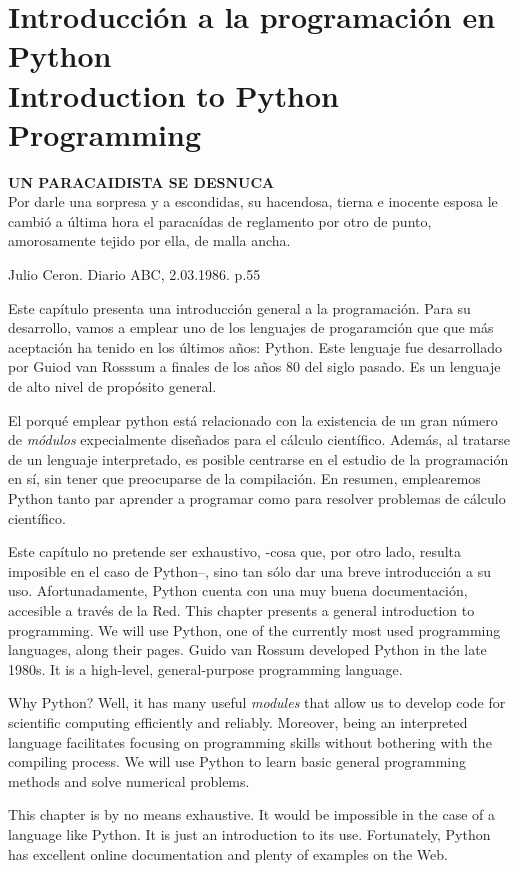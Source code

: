 \chapter{Introducción a la programación en Python\\ Introduction to Python Programming}\label{ch:intpr}  
\epigraph{\textbf{UN PARACAIDISTA SE DESNUCA}\\ Por darle una sorpresa y a escondidas, su hacendosa, tierna e inocente esposa le cambió a última hora el paracaídas de reglamento por otro de punto, amorosamente tejido por ella, de malla ancha.}{Julio Ceron. Diario ABC, 2.03.1986. p.55}
\begin{paracol}{2}
Este capítulo presenta una introducción general a la programación. Para su desarrollo, vamos a emplear uno de los lenguajes de progaramción que  que más aceptación ha tenido en los últimos años: Python. Este lenguaje fue desarrollado por Guiod van Rosssum a finales de los años 80 del siglo pasado. Es un lenguaje de alto nivel de propósito general.

El porqué emplear python está relacionado con la existencia de un gran número de \emph{módulos} expecialmente diseñados para el cálculo científico. Además, al tratarse de un lenguaje interpretado, es posible centrarse en el estudio de la programación en sí, sin tener que preocuparse de la compilación. En resumen, emplearemos Python tanto par aprender a programar como para resolver problemas de cálculo científico.

Este capítulo no pretende ser exhaustivo, -cosa que, por otro lado, resulta imposible en el caso de Python--, sino tan sólo dar una breve introducción a su uso. Afortunadamente, Python cuenta con una muy buena documentación, accesible a través de la Red. 
\switchcolumn 
This chapter presents a general introduction to programming. We will use Python, one of the currently most used programming languages, along their pages. Guido van Rossum developed Python in the late 1980s. It is a high-level, general-purpose programming language. 

Why Python? Well, it has many useful \emph{modules} that allow us to develop code for scientific computing efficiently and reliably. Moreover, being an interpreted language facilitates focusing on programming skills without bothering with the compiling process. We will use Python to learn basic general programming methods and solve numerical problems.

This chapter is by no means exhaustive. It would be impossible in the case of a language like Python. It is just an introduction to its use. Fortunately, Python has excellent online documentation and plenty of examples on the Web. 
\end{paracol}


